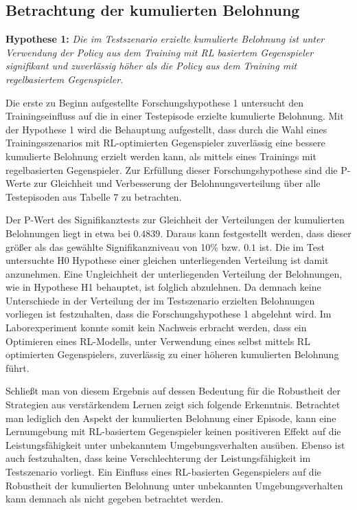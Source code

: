\subsection{Betrachtung der kumulierten Belohnung}

\textbf{Hypothese 1:}
\textit{Die im Testszenario erzielte kumulierte Belohnung ist unter Verwendung der Policy aus dem Training mit RL basiertem Gegenspieler signifikant und zuverlässig höher als die Policy aus dem Training mit regelbasiertem Gegenspieler.}

Die erste zu Beginn aufgestellte Forschungshypothese 1 untersucht den Trainingseinfluss auf die in einer Testepisode erzielte kumulierte Belohnung.
Mit der Hypothese 1 wird die Behauptung aufgestellt, dass durch die Wahl eines Trainingsszenarios mit RL-optimierten Gegenspieler zuverlässig eine bessere kumulierte Belohnung erzielt werden kann, als mittels eines Trainings mit regelbasierten Gegenspieler.
Zur Erfüllung dieser Forschungshypothese sind die P-Werte zur Gleichheit und Verbesserung der Belohnungsverteilung über alle Testepisoden aus Tabelle 7 zu betrachten. 

Der P-Wert des Signifikanztests zur Gleichheit der Verteilungen der kumulierten Belohnungen liegt in etwa bei $0.4839$.
Daraus kann festgestellt werden, dass dieser größer als das gewählte Signifikanzniveau von 10\% bzw. $0.1$ ist.
Die im Test untersuchte H0 Hypothese einer gleichen unterliegenden Verteilung ist damit anzunehmen.
Eine Ungleichheit der unterliegenden Verteilung der Belohnungen, wie in Hypothese H1 behauptet, ist folglich abzulehnen.
Da demnach keine Unterschiede in der Verteilung der im Testszenario erzielten Belohnungen vorliegen ist festzuhalten, dass die Forschungshypothese 1 abgelehnt wird.
Im Laborexperiment konnte somit kein Nachweis erbracht werden, dass ein Optimieren eines RL-Modells, unter Verwendung eines selbst mittels RL optimierten Gegenspielers, zuverlässig zu einer höheren kumulierten Belohnung führt.

Schließt man von diesem Ergebnis auf dessen Bedeutung für die Robustheit der Strategien aus verstärkendem Lernen zeigt sich folgende Erkenntnis.
Betrachtet man lediglich den Aspekt der kumulierten Belohnung einer Episode, kann eine Lernumgebung mit RL-basiertem Gegenspieler keinen positiveren Effekt auf die Leistungsfähigkeit unter unbekanntem Umgebungsverhalten ausüben.
Ebenso ist auch festzuhalten, dass keine Verschlechterung der Leistungsfähigkeit im Testszenario vorliegt. 
Ein Einfluss eines RL-basierten Gegenspielers auf die Robustheit der kumulierten Belohnung unter unbekannten Umgebungsverhalten kann demnach als nicht gegeben betrachtet werden.


